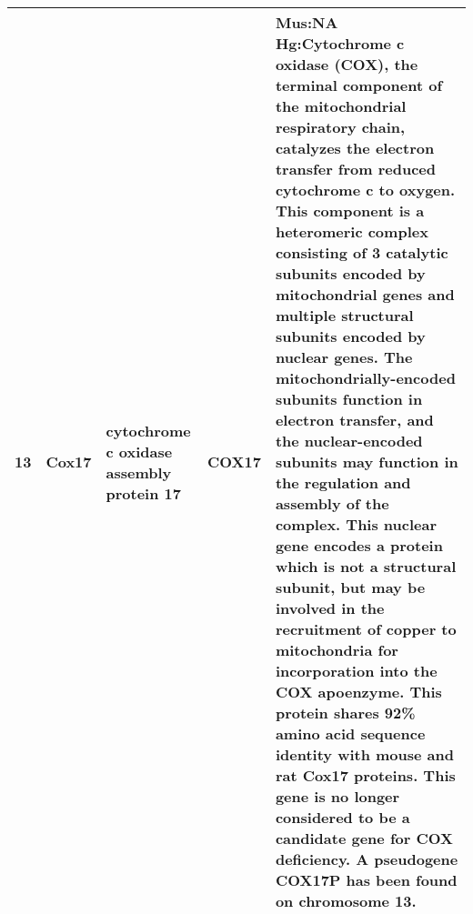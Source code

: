 \documentclass[11pt, landscape]{article}   	%
\begin{document}
\begin{table}[ht]
\begin{tabular}{rlp{3cm}lp{12cm}}
  13 & Cox17 & cytochrome c oxidase assembly protein 17 & COX17 & Mus:NA Hg:Cytochrome c oxidase (COX), the terminal component of the mitochondrial respiratory chain, catalyzes the electron transfer from reduced cytochrome c to oxygen. This component is a heteromeric complex consisting of 3 catalytic subunits encoded by mitochondrial genes and multiple structural subunits encoded by nuclear genes. The mitochondrially-encoded subunits function in electron transfer, and the nuclear-encoded subunits may function in the regulation and assembly of the complex. This nuclear gene encodes a protein which is not a structural subunit, but may be involved in the recruitment of copper to mitochondria for incorporation into the COX apoenzyme. This protein shares 92\% amino acid sequence identity with mouse and rat Cox17 proteins. This gene is no longer considered to be a candidate gene for COX deficiency. A pseudogene COX17P has been found on chromosome 13. \\ 

   \hline
\end{tabular}
\end{table}
\end{document}
